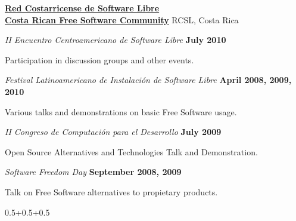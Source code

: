 \documentclass[10pt]{article}
\newlength{\footpageshift}
\newenvironment{outerlist}[1][\enskip\textbullet]%
        {\begin{itemize}[#1]}{\end{itemize}%
         \vspace{-0.9\baselineskip}}
\newenvironment{innerlist}[1][\enskip\textbullet]%
        {\begin{compactitem}[#1]}{\end{compactitem}}
\begin{document}
\href{http://www.softwarelibrecr.org/}{\textbf{Red Costarricense de Software Libre}}\\
\href{http://www.softwarelibrecr.org/}{\textbf{Costa Rican Free Software Community}} RCSL, Costa Rica
\begin{outerlist}
	
	\item[] \textit{II Encuentro Centroamericano de Software Libre}
		\hfill \textbf{July 2010}
					\begin{innerlist}
			\item Participation in discussion groups and other events.
	
			\end{innerlist}


	\item[] \textit{Festival Latinoamericano de Instalaci\'{o}n de Software Libre}
		\hfill \textbf{April 2008, 2009, 2010}
			\begin{innerlist}
			\item Various talks and demonstrations on basic Free Software usage.
	
			\end{innerlist}
			
	\item[] \textit{II Congreso de Computaci\'{o}n para el Desarrollo}
		\hfill \textbf{July 2009}
			\begin{innerlist}
			\item Open Source Alternatives and Technologies Talk and Demonstration.
			\end{innerlist}

	\item[] \textit{Software Freedom Day}
		\hfill \textbf{September 2008, 2009}
			\begin{innerlist}
			\item Talk on Free Software alternatives to propietary products.\\
			\end{innerlist}

\end{outerlist}

\setlength{\footpageshift}
          {0.5\textwidth+0.5\marginparsep+0.5\marginparwidth-2in}
\end{document}
